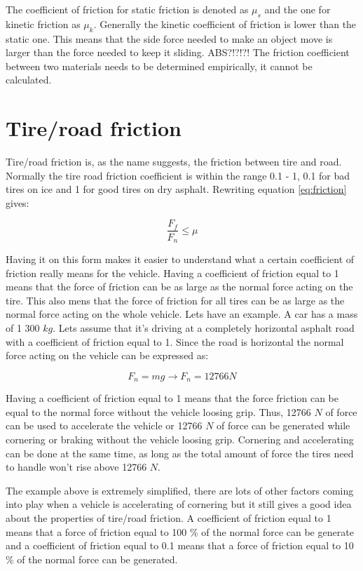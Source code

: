 The coefficient of friction for static friction is denoted as $ \mu_{s} $ and the one for kinetic friction as $ \mu_{k} $. Generally the kinetic coefficient of friction is lower than the static one. This means that the side force needed to make an object move is larger than the force needed to keep it sliding. ABS?!?!?! The friction coefficient between two materials needs to be determined empirically, it cannot be calculated. 

\section{Tire/road friction}
Tire/road friction is, as the name suggests, the friction between tire and road. Normally the tire road friction coefficient is within the range 0.1 - 1, 0.1 for bad tires on ice and 1 for good tires on dry asphalt. Rewriting equation \ref{eq:friction} gives:

\begin{equation} \label{eq:friction2}
\frac{F_{f}}{F_{n}} \leq\mu
\end{equation}

Having it on this form makes it easier to understand what a certain coefficient of friction really means for the vehicle. Having a coefficient of friction equal to 1 means that the force of friction can be as large as the normal force acting on the tire. This also mens that the force of friction for all tires can be as large as the normal force acting on the whole vehicle. Lets have an example. A car has a mass of 1 300 $ kg $. Lets assume that it's driving at a completely horizontal asphalt road with a coefficient of friction equal to 1. Since the road is horizontal the normal force acting on the vehicle can be expressed as:

\begin{equation} \label{eq:friction3}
F_{n}=mg \rightarrow F_{n} = 12766 N 
\end{equation}

Having a coefficient of friction equal to 1 means that the force friction can be equal to the normal force without the vehicle loosing grip. Thus, 12766 $ N $ of force can be used to accelerate the vehicle or 12766 $ N $ of force can be generated while cornering or braking without the vehicle loosing grip. Cornering and accelerating can be done at the same time, as long as the total amount of force the tires need to handle won't rise above 12766 $ N $.

The example above is extremely simplified, there are lots of other factors coming into play when a vehicle is accelerating of cornering but it still gives a good idea about the properties of tire/road friction. A coefficient of friction equal to 1 means that a force of friction equal to 100 $ \% $ of the normal force can be generate and a coefficient of friction equal to 0.1 means that a force of friction equal to 10 $ \% $ of the normal force can be generated.

